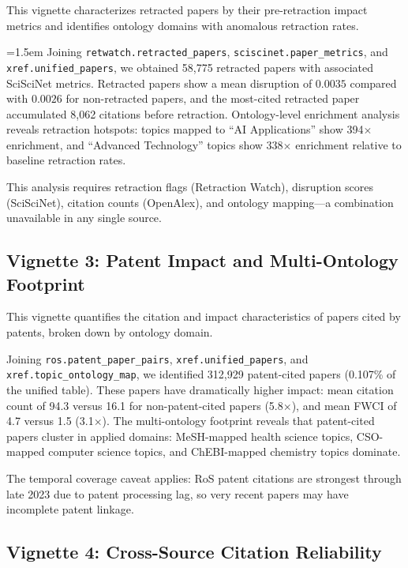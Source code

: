 This vignette characterizes retracted papers by their pre-retraction impact
metrics and identifies ontology domains with anomalous retraction rates.

{\emergencystretch=1.5em
Joining \texttt{retwatch.retracted\_papers}, \texttt{sciscinet.paper\_metrics},
and \texttt{xref.unified\_papers}, we obtained 58,775 retracted papers with
associated SciSciNet metrics. Retracted papers show a mean disruption of
$0.0035$ compared with $0.0026$ for non-retracted papers, and the most-cited
retracted paper accumulated 8,062 citations before retraction. Ontology-level
enrichment analysis reveals retraction hotspots: topics mapped to ``AI
Applications'' show 394$\times$ enrichment, and ``Advanced Technology''
topics show 338$\times$ enrichment relative to baseline retraction rates.\par}

This analysis requires retraction flags (Retraction Watch), disruption
scores (SciSciNet), citation counts (OpenAlex), and ontology mapping---a
combination unavailable in any single source.

\subsection{Vignette 3: Patent Impact and Multi-Ontology Footprint}

This vignette quantifies the citation and impact characteristics of papers
cited by patents, broken down by ontology domain.

Joining \texttt{ros.patent\_paper\_pairs}, \texttt{xref.unified\_papers},
and \texttt{xref.topic\_ontology\_map}, we identified 312,929 patent-cited
papers (0.107\% of the unified table). These papers have dramatically
higher impact: mean citation count of 94.3 versus 16.1 for non-patent-cited
papers (5.8$\times$), and mean FWCI of 4.7 versus 1.5 (3.1$\times$). The
multi-ontology footprint reveals that patent-cited papers cluster in applied
domains: MeSH-mapped health science topics, CSO-mapped computer science
topics, and ChEBI-mapped chemistry topics dominate.

The temporal coverage caveat applies: RoS patent citations are strongest
through late 2023 due to patent processing lag, so very recent papers may
have incomplete patent linkage.

\subsection{Vignette 4: Cross-Source Citation Reliability}

